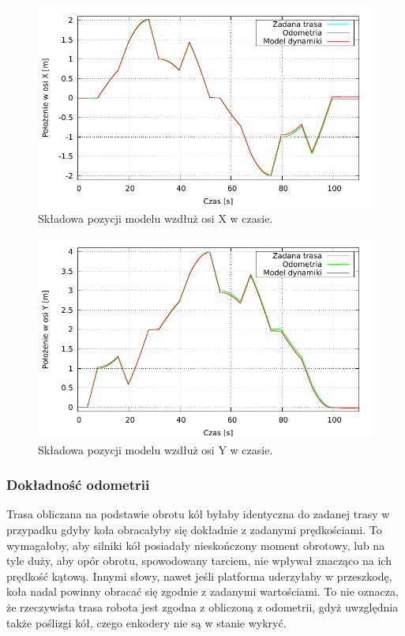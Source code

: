 		\begin{figure}[H]
			\centering
			\includegraphics[width=\textwidth]{plots/comparison_xt.pdf}
				\caption{Składowa pozycji modelu wzdłuż osi X w czasie.}
			\label{plot:comparison_xt}
		\end{figure}
		
		\begin{figure}[H]
			\centering
			\includegraphics[width=\textwidth]{plots/comparison_yt.pdf}
				\caption{Składowa pozycji modelu wzdłuż osi Y w czasie.}
			\label{plot:comparison_yt}
		\end{figure}
		
		\subsubsection{Dokładność odometrii}
			Trasa obliczana na podstawie obrotu kół byłaby identyczna do zadanej trasy w przypadku gdyby koła obracałyby się dokładnie z zadanymi prędkościami.
			To wymagałoby, aby silniki kół posiadały nieskończony moment obrotowy, lub na tyle duży, aby opór obrotu, spowodowany tarciem, nie wpływał 
			znacząco na ich prędkość kątową. Innymi słowy, nawet jeśli platforma uderzyłaby w przeszkodę, koła nadal powinny obracać się zgodnie z zadanymi wartościami.
			To nie oznacza, że rzeczywista trasa robota jest zgodna z obliczoną z odometrii, gdyż uwzględnia także poślizgi kół, czego enkodery nie są w stanie wykryć.
			
